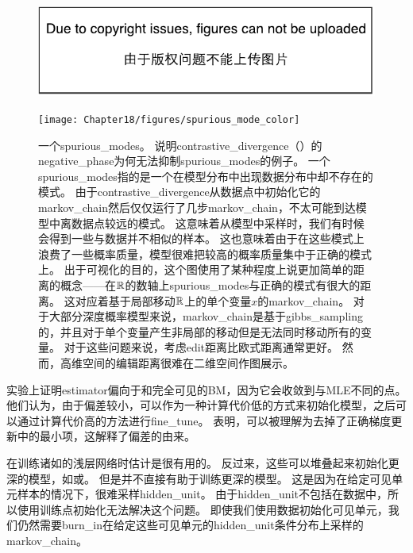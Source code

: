 
\begin{figure}[!htb]
\ifOpenSource
\centerline{\includegraphics{figure.pdf}}
\else
\centerline{\texttt{[image: Chapter18/figures/spurious\_mode\_color]}}
\fi
\caption{一个\gls{spurious_modes}。
说明\gls{contrastive_divergence}（）的\gls{negative_phase}为何无法抑制\gls{spurious_modes}的例子。
一个\gls{spurious_modes}指的是一个在模型分布中出现数据分布中却不存在的模式。
由于\gls{contrastive_divergence}从数据点中初始化它的\gls{markov_chain}然后仅仅运行了几步\gls{markov_chain}，不太可能到达模型中离数据点较远的模式。
这意味着从模型中采样时，我们有时候会得到一些与数据并不相似的样本。
这也意味着由于在这些模式上浪费了一些概率质量，模型很难把较高的概率质量集中于正确的模式上。
出于可视化的目的，这个图使用了某种程度上说更加简单的距离的概念——在$\mathbb{R}$的数轴上\gls{spurious_modes}与正确的模式有很大的距离。
这对应着基于局部移动$\mathbb{R}$上的单个变量$x$的\gls{markov_chain}。
对于大部分深度概率模型来说，\gls{markov_chain}是基于\gls{gibbs_sampling}的，并且对于单个变量产生非局部的移动但是无法同时移动所有的变量。
对于这些问题来说，考虑edit距离比欧式距离通常更好。
然而，高维空间的编辑距离很难在二维空间作图展示。}
\label{fig:chap18_spurious_mode}
\end{figure}


\cite{Perpinan+Hinton-2005-small}实验上证明\gls{estimator}偏向于和完全可见的\gls{BM}，因为它会收敛到与\gls{MLE}不同的点。
他们认为，由于偏差较小，可以作为一种计算代价低的方式来初始化模型，之后可以通过计算代价高的方法进行\gls{fine_tune}。
\cite{Bengio+Delalleau-2009}表明，可以被理解为去掉了正确梯度更新中的最小项，这解释了偏差的由来。


在训练诸如的浅层网络时估计是很有用的。
反过来，这些可以堆叠起来初始化更深的模型，如或。
但是并不直接有助于训练更深的模型。
这是因为在给定可见单元样本的情况下，很难采样\gls{hidden_unit}。
由于\gls{hidden_unit}不包括在数据中，所以使用训练点初始化无法解决这个问题。
即使我们使用数据初始化可见单元，我们仍然需要\gls{burn_in}在给定这些可见单元的\gls{hidden_unit}条件分布上采样的\gls{markov_chain}。

